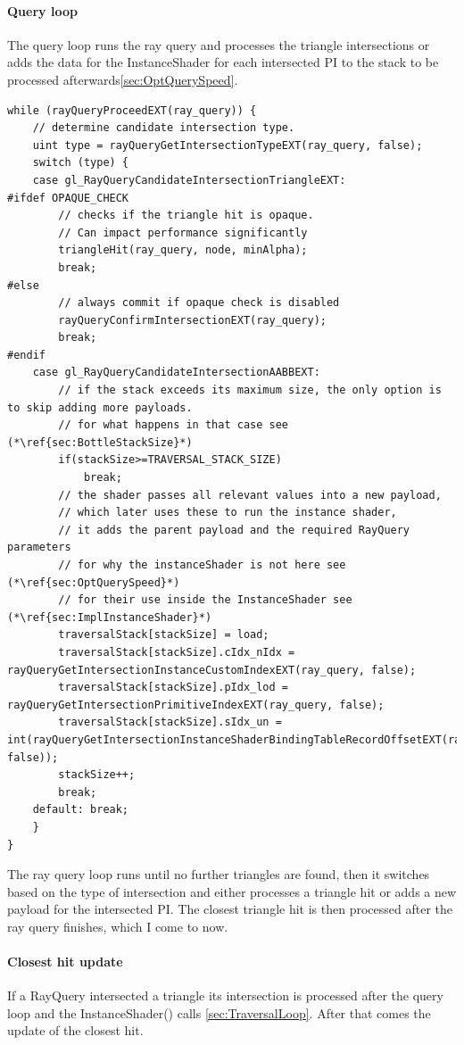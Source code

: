 \paragraph{Query loop}
\label{sec:ImplQueryLoop}
The query loop runs the ray query and processes the triangle intersections or adds the data for the InstanceShader for each intersected PI to the stack to be processed afterwards\ref{sec:OptQuerySpeed}.
\begin{lstlisting}
while (rayQueryProceedEXT(ray_query)) {
    // determine candidate intersection type.
	uint type = rayQueryGetIntersectionTypeEXT(ray_query, false);
	switch (type) {
	case gl_RayQueryCandidateIntersectionTriangleEXT:
#ifdef OPAQUE_CHECK	
		// checks if the triangle hit is opaque. 
		// Can impact performance significantly
		triangleHit(ray_query, node, minAlpha);
		break;
#else
		// always commit if opaque check is disabled
		rayQueryConfirmIntersectionEXT(ray_query);
		break;
#endif
	case gl_RayQueryCandidateIntersectionAABBEXT:
	    // if the stack exceeds its maximum size, the only option is to skip adding more payloads.
	    // for what happens in that case see (*\ref{sec:BottleStackSize}*)
		if(stackSize>=TRAVERSAL_STACK_SIZE)
			break;
		// the shader passes all relevant values into a new payload, 
		// which later uses these to run the instance shader, 
		// it adds the parent payload and the required RayQuery parameters
		// for why the instanceShader is not here see (*\ref{sec:OptQuerySpeed}*)
		// for their use inside the InstanceShader see (*\ref{sec:ImplInstanceShader}*)
		traversalStack[stackSize] = load;
		traversalStack[stackSize].cIdx_nIdx = rayQueryGetIntersectionInstanceCustomIndexEXT(ray_query, false);
		traversalStack[stackSize].pIdx_lod = rayQueryGetIntersectionPrimitiveIndexEXT(ray_query, false);
		traversalStack[stackSize].sIdx_un = int(rayQueryGetIntersectionInstanceShaderBindingTableRecordOffsetEXT(ray_query, false));
		stackSize++;
		break;
	default: break;
	}
}
\end{lstlisting}
The ray query loop runs until no further triangles are found, then it switches based on the type of intersection and either processes a triangle hit or adds a new payload for the intersected PI. The closest triangle hit is then processed after the ray query finishes, which I come to now.
\newpage
\paragraph{Closest hit update}
\label{sec:ImplClosestHit}
If a RayQuery intersected a triangle its intersection is processed after the query loop and the InstanceShader() calls \ref{sec:TraversalLoop}. After that comes the update of the closest hit.

